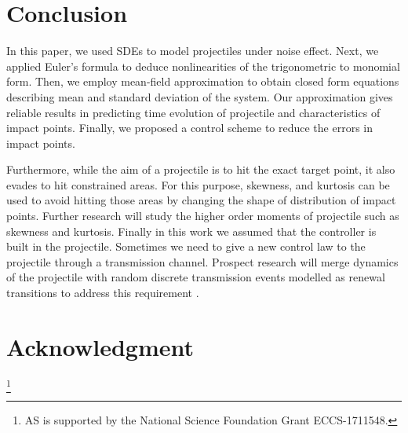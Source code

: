 \documentclass[letterpaper, 10 pt, conference]{ieeeconf}  %
\begin{document}
\section{Conclusion}
In this paper, we used SDEs to model projectiles under noise effect. Next, we applied Euler's formula to deduce nonlinearities of  the trigonometric to monomial form. Then, we employ mean-field approximation to obtain closed form equations describing mean and standard deviation of the system. Our approximation gives reliable results in predicting time evolution of projectile and characteristics of impact points. Finally, we proposed a control scheme to reduce the errors in impact points.

Furthermore, while the aim of a projectile is to hit the exact target point, it also evades to hit constrained areas. For this purpose, skewness, and kurtosis can be used to avoid hitting those areas by changing the shape of distribution of impact points. Further research will study the higher order moments of projectile such as skewness and kurtosis. Finally in this work we assumed that the controller is built in the projectile. Sometimes we need to give a new control law to the projectile through a transmission channel. Prospect research will merge dynamics of the projectile with random discrete transmission events modelled as renewal transitions to address this requirement \cite{sos17, sos17b, sos16c}.

\section*{Acknowledgment}
\thanks{AS is supported by the National Science Foundation Grant ECCS-1711548.}


%


%
%

\end{document}
